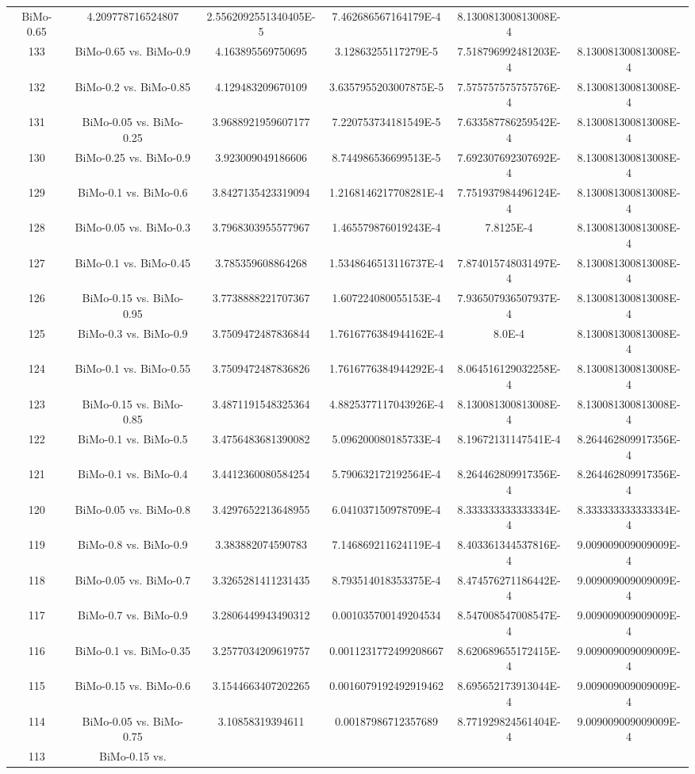 \documentclass[a4paper,10pt]{article}
\begin{document}
\begin{landscape}
\begin{table}[!htp]
\begin{tabular}{cccccc}
BiMo-0.65&4.209778716524807&2.5562092551340405E-5&7.462686567164179E-4&8.130081300813008E-4\\133&BiMo-0.65 vs. BiMo-0.9&4.163895569750695&3.12863255117279E-5&7.518796992481203E-4&8.130081300813008E-4\\132&BiMo-0.2 vs. BiMo-0.85&4.129483209670109&3.6357955203007875E-5&7.575757575757576E-4&8.130081300813008E-4\\131&BiMo-0.05 vs. BiMo-0.25&3.9688921959607177&7.220753734181549E-5&7.633587786259542E-4&8.130081300813008E-4\\130&BiMo-0.25 vs. BiMo-0.9&3.923009049186606&8.744986536699513E-5&7.692307692307692E-4&8.130081300813008E-4\\129&BiMo-0.1 vs. BiMo-0.6&3.8427135423319094&1.2168146217708281E-4&7.751937984496124E-4&8.130081300813008E-4\\128&BiMo-0.05 vs. BiMo-0.3&3.7968303955577967&1.465579876019243E-4&7.8125E-4&8.130081300813008E-4\\127&BiMo-0.1 vs. BiMo-0.45&3.785359608864268&1.5348646513116737E-4&7.874015748031497E-4&8.130081300813008E-4\\126&BiMo-0.15 vs. BiMo-0.95&3.7738888221707367&1.607224080055153E-4&7.936507936507937E-4&8.130081300813008E-4\\125&BiMo-0.3 vs. BiMo-0.9&3.7509472487836844&1.7616776384944162E-4&8.0E-4&8.130081300813008E-4\\124&BiMo-0.1 vs. BiMo-0.55&3.7509472487836826&1.7616776384944292E-4&8.064516129032258E-4&8.130081300813008E-4\\123&BiMo-0.15 vs. BiMo-0.85&3.4871191548325364&4.8825377117043926E-4&8.130081300813008E-4&8.130081300813008E-4\\122&BiMo-0.1 vs. BiMo-0.5&3.4756483681390082&5.096200080185733E-4&8.19672131147541E-4&8.264462809917356E-4\\121&BiMo-0.1 vs. BiMo-0.4&3.4412360080584254&5.790632172192564E-4&8.264462809917356E-4&8.264462809917356E-4\\120&BiMo-0.05 vs. BiMo-0.8&3.4297652213648955&6.041037150978709E-4&8.333333333333334E-4&8.333333333333334E-4\\119&BiMo-0.8 vs. BiMo-0.9&3.383882074590783&7.146869211624119E-4&8.403361344537816E-4&9.009009009009009E-4\\118&BiMo-0.05 vs. BiMo-0.7&3.3265281411231435&8.793514018353375E-4&8.474576271186442E-4&9.009009009009009E-4\\117&BiMo-0.7 vs. BiMo-0.9&3.2806449943490312&0.001035700149204534&8.547008547008547E-4&9.009009009009009E-4\\116&BiMo-0.1 vs. BiMo-0.35&3.2577034209619757&0.0011231772499208667&8.620689655172415E-4&9.009009009009009E-4\\115&BiMo-0.15 vs. BiMo-0.6&3.1544663407202265&0.0016079192492919462&8.695652173913044E-4&9.009009009009009E-4\\114&BiMo-0.05 vs. BiMo-0.75&3.10858319394611&0.00187986712357689&8.771929824561404E-4&9.009009009009009E-4\\113&BiMo-0.15 vs. 
\end{tabular}
\end{table}
\end{landscape}
\end{document}
